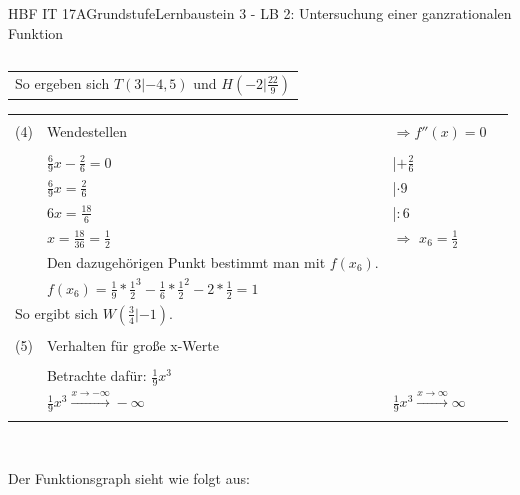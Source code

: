 \documentclass[oneside,openany,headings=optiontotoc,11pt,numbers=noenddot]{scrreprt}
\begin{document}
\begin{worksheet}{HBF IT 17A}{Grundstufe}{Lernbaustein 3 - LB 2: Untersuchung einer ganzrationalen Funktion}
\begin{framed}
\begin{tabularx}{\textwidth}{ll}
			\end{tabularx}
			\begin{tabularx}{\textwidth}{ll}
				\multicolumn{2}{l}{So ergeben sich \colorbox{blue!5}{\(T(3|-4,5)\)} und \colorbox{blue!5}{\(H(-2|\frac{22}{9})\)}}\\
			\end{tabularx}
			\begin{tabularx}{\textwidth}{lXXl}
				\hline\hline\\
				(4) & Wendestellen & \(\Rightarrow f''(x) = 0\)\\
				\hline\\
				& \(\frac{6}{9}x - \frac{2}{6} = 0\) & |\(+\frac{2}{6}\)\\
				& \(\frac{6}{9}x = \frac{2}{6}\) & |\(\cdot9\)\\
				& \(6x = \frac{18}{6}\) & |\(:6\)\\
				& \(x = \frac{18}{36} = \frac{1}{2}\) & \(\Rightarrow\) \colorbox{green!10}{\(x_6 = \frac{1}{2}\)}\\
				& Den dazugehörigen Punkt bestimmt man mit \(f(x_6)\).\\
				& \(f(x_6) = \frac{1}{9}*\frac{1}{2}^3 -\frac{1}{6}*\frac{1}{2}^2 -2*\frac{1}{2} = 1\)\\
				\multicolumn{2}{l}{So ergibt sich \colorbox{blue!5}{\(W(\frac{3}{4}|-1)\)}.}\\
				\hline\hline\\
				(5) & Verhalten für große x-Werte\\
				\hline\\
				& Betrachte dafür: \(\frac{1}{9}x^3\)\\
				& \colorbox{green!10}{\(\frac{1}{9}x^3\xrightarrow{x\rightarrow-\infty}-\infty\)} & \colorbox{green!10}{\(\frac{1}{9}x^3\xrightarrow{x\rightarrow\infty}\infty\)}\\
				\hline\hline\\
			\end{tabularx}\\
			\par\noindent
			Der Funktionsgraph sieht wie folgt aus:\\
			\par

\end{framed}
\end{worksheet}
\end{document}
